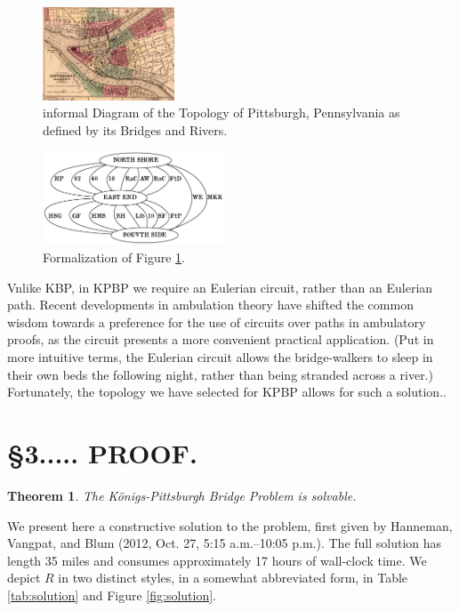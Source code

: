 \documentclass[twocolumn]{article}
\theoremstyle{plain}  %
\newtheorem{thm}{Theorem}
\theoremstyle{definition}  %
\theoremstyle{remark}  %
\begin{document}
\begin{figure}[t]
\centering
	\includegraphics[width=0.35\textwidth]{1859pittsburgh.jpg}
	\caption{informal Diagram of the Topology of Pittsburgh, Pennsylvania as defined by its Bridges and Rivers.}
	\label{fig:map}
\end{figure}

\begin{figure}[t]
\centering
	\includegraphics[width=0.48\textwidth]{topology.pdf}
	\caption{Formalization of Figure \ref{fig:map}.}
	\label{fig:topo}
\end{figure}

Vnlike KBP, in KPBP we require an Eulerian circuit, rather than an Eulerian path.
Recent developments in ambulation theory have shifted the common wisdom towards a preference for the use of circuits over paths in ambulatory proofs, as the circuit presents a more convenient practical application. (Put in more intuitive terms, the Eulerian circuit allows the bridge-walkers to sleep in their own beds the following night, rather than being stranded across a river.) Fortunately, the topology we have selected for KPBP allows for such a solution..

\section*{\S 3..... PROOF.}

\begin{thm}
The K\"onigs-Pittsburgh Bridge Problem is solvable.
\end{thm}

We present here a constructive solution to the problem, first given by Hanneman, Vangpat, and Blum (2012, Oct. 27, 5:15 a.m.--10:05 p.m.).  The full solution has length 35 miles and consumes approximately 17 hours of wall-clock time. We depict $R$ in two distinct styles, in a somewhat abbreviated form, in Table \ref{tab:solution} and Figure \ref{fig:solution}.
\end{document}

